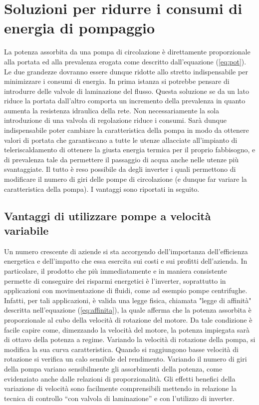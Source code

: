 \documentclass[laurea,oneside,11pt]{USiena_tesiLM3}
\begin{document}
\section{Soluzioni per ridurre i consumi di energia di pompaggio}
La potenza assorbita da una pompa di circolazione è direttamente proporzionale alla portata ed alla prevalenza erogata come descritto dall'equazione (\ref{eq:pot}). Le due grandezze dovranno essere dunque ridotte allo stretto indispensabile per minimizzare i consumi di energia.
In prima istanza si potrebbe pensare di introdurre delle valvole di laminazione del flusso. Questa soluzione se da un lato riduce la portata dall'altro comporta un incremento della prevalenza in quanto aumenta la resistenza idraulica della rete.
Non necessariamente la sola introduzione di una valvola di regolazione riduce i consumi. Sarà dunque indispensabile poter cambiare la caratteristica della pompa in modo da ottenere  valori di portata che garantiscano a tutte le utenze allacciate all'impianto di teleriscaldamento di ottenere la giusta energia termica per il proprio fabbisogno, e di prevalenza tale da permettere il passaggio di acqua anche nelle utenze più svantaggiate.
Il tutto è reso possibile da degli inverter i quali permettono di modificare il numero di giri delle pompe di circolazione (e dunque far variare la caratteristica della pompa). I vantaggi sono riportati in seguito.

\subsection{Vantaggi di utilizzare pompe a velocità variabile}
Un numero crescente di aziende si sta accorgendo dell'importanza dell'efficienza energetica e dell'impatto che essa esercita sui costi e sui profitti dell'azienda.
In particolare, il prodotto che più immediatamente e in maniera consistente permette di conseguire dei risparmi energetici è l'inverter, soprattutto in applicazioni con movimentazione di fluidi, come ad esempio pompe centrifughe. Infatti, per tali applicazioni, è valida una legge fisica, chiamata "legge di affinità" descritta nell'equazione (\ref{eq:affinita}), la quale afferma che la potenza assorbita è proporzionale al cubo della velocità di rotazione del motore. Da tale condizione è facile capire come, dimezzando la velocità del motore, la potenza impiegata sarà di ottavo della potenza a regime. 
Variando la velocità di rotazione della pompa, si modifica la sua curva caratteristica. Quando si raggiungono basse velocità di rotazione si verifica un calo sensibile del rendimento. Variando il numero di giri della pompa variano sensibilmente gli assorbimenti della potenza, come evidenziato anche dalle relazioni di proporzionalità. Gli effetti benefici della variazione di velocità sono facilmente comprensibili mettendo in relazione la tecnica di controllo “con valvola di laminazione” e con l’utilizzo di inverter. 
\end{document}
